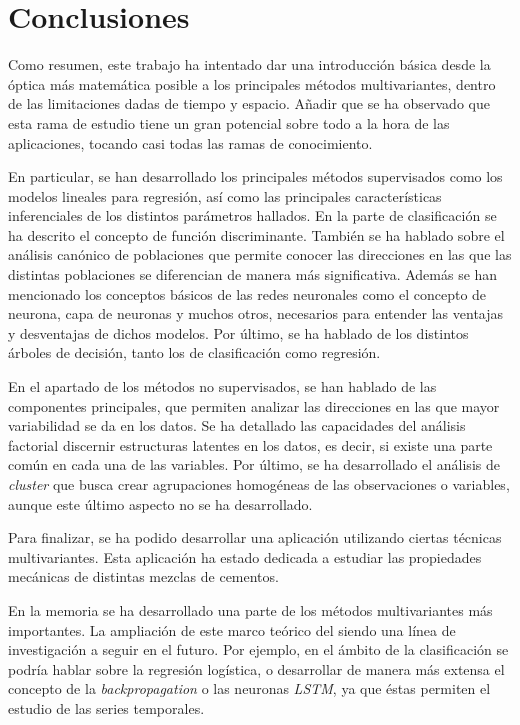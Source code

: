 \chapter{Conclusiones}

\noindent Como resumen, este trabajo ha intentado dar una introducción básica desde la óptica más matemática posible a los principales métodos multivariantes, dentro de las limitaciones dadas de tiempo y espacio. Añadir que  se ha observado que esta rama de estudio tiene un gran potencial sobre todo a la hora de las aplicaciones, tocando casi todas las ramas de conocimiento.

\noindent En particular, se han desarrollado los principales métodos supervisados como los modelos lineales para regresión, así como las principales características inferenciales de los distintos parámetros hallados. En la parte de clasificación se ha descrito el concepto de función discriminante. También  se ha hablado sobre el análisis canónico de poblaciones que permite conocer las direcciones en las que las distintas poblaciones se diferencian de manera más significativa. Además se han mencionado los conceptos básicos de las redes neuronales como el concepto de neurona, capa de neuronas y muchos otros, necesarios para entender las ventajas y desventajas de dichos modelos. Por último,  se ha hablado de los distintos árboles de decisión, tanto los de clasificación como regresión.

\noindent En el apartado de los métodos no  supervisados, se han hablado de las componentes principales, que permiten analizar las direcciones en las que mayor variabilidad se da en los datos. Se ha detallado las capacidades del análisis factorial discernir estructuras latentes en los datos, es decir, si existe una parte común en cada una de las variables. Por último, se ha desarrollado el análisis de \emph{cluster} que busca crear agrupaciones homogéneas de las observaciones o variables, aunque este último aspecto no se ha desarrollado. 

\noindent Para finalizar, se ha podido desarrollar una aplicación utilizando ciertas técnicas multivariantes. Esta aplicación ha estado dedicada a estudiar las propiedades mecánicas de distintas mezclas de cementos. 

 
\noindent En la memoria se ha desarrollado una parte de los métodos multivariantes más importantes. La ampliación de este marco teórico del siendo una línea de investigación a seguir en el futuro. Por ejemplo, en el ámbito de la clasificación se podría hablar sobre la regresión logística, o desarrollar de manera más extensa el concepto de la \emph{backpropagation} o las neuronas \emph{LSTM}, ya que éstas permiten el estudio de las series temporales.  

